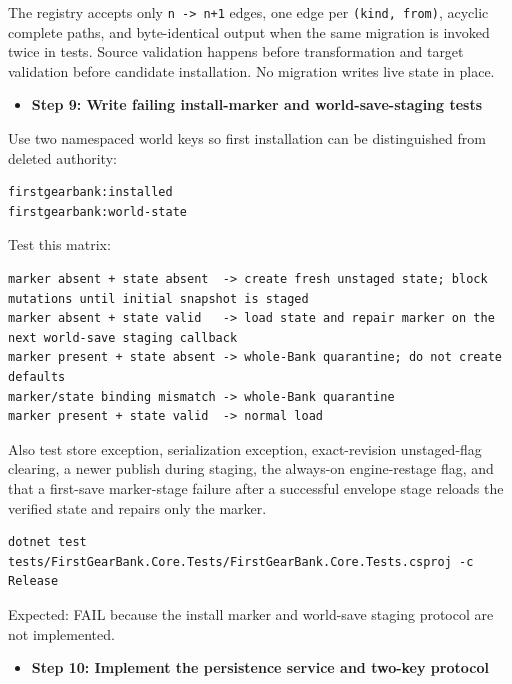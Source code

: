 \documentclass[
  10pt,
  letterpaper,
]{article}
\newcommand{\passthrough}[1]{#1}
\providecommand{\tightlist}{%
  \setlength{\itemsep}{0pt}\setlength{\parskip}{0pt}}
\begin{document}
The registry accepts only \passthrough{\lstinline!n -> n+1!} edges, one
edge per \passthrough{\lstinline!(kind, from)!}, acyclic complete paths,
and byte-identical output when the same migration is invoked twice in
tests. Source validation happens before transformation and target
validation before candidate installation. No migration writes live state
in place.

\begin{itemize}
\tightlist
\item[$\square$]
  \textbf{Step 9: Write failing install-marker and world-save-staging
  tests}
\end{itemize}

Use two namespaced world keys so first installation can be distinguished
from deleted authority:

\begin{lstlisting}
firstgearbank:installed
firstgearbank:world-state
\end{lstlisting}

Test this matrix:

\begin{lstlisting}
marker absent + state absent  -> create fresh unstaged state; block mutations until initial snapshot is staged
marker absent + state valid   -> load state and repair marker on the next world-save staging callback
marker present + state absent -> whole-Bank quarantine; do not create defaults
marker/state binding mismatch -> whole-Bank quarantine
marker present + state valid  -> normal load
\end{lstlisting}

Also test store exception, serialization exception, exact-revision
unstaged-flag clearing, a newer publish during staging, the always-on
engine-restage flag, and that a first-save marker-stage failure after a
successful envelope stage reloads the verified state and repairs only
the marker.

\begin{lstlisting}
dotnet test tests/FirstGearBank.Core.Tests/FirstGearBank.Core.Tests.csproj -c Release
\end{lstlisting}

Expected: FAIL because the install marker and world-save staging
protocol are not implemented.

\begin{itemize}
\tightlist
\item[$\square$]
  \textbf{Step 10: Implement the persistence service and two-key
  protocol}
\end{itemize}
\end{document}
